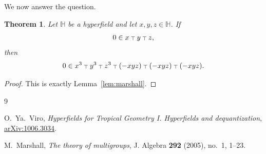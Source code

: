 \documentclass[11pt]{article}
\newtheorem{theorem}{Theorem}
\newcommand{\boxplus}{\mathbin{\lower 0.86108pt\hbox{$\scriptstyle\top$}}}
\newcommand{\hypfield}{\mathbb{H}}
\begin{document}
We now answer the question.

\begin{theorem}\label{thm:main}
Let \(\hypfield\) be a hyperfield and let \(x,y,z\in\hypfield\).  If
\[
0\in x\boxplus y\boxplus z,
\]
then
\[
0\in x^3\boxplus y^3\boxplus z^3
\boxplus (-xyz)\boxplus (-xyz)\boxplus (-xyz).
\]
\end{theorem}

\begin{proof}
This is exactly Lemma~\ref{lem:marshall}.
\end{proof}

\begin{thebibliography}{9}

O.~Ya.~Viro,
\emph{Hyperfields for Tropical Geometry I. Hyperfields and dequantization},
\href{https://ar5iv.labs.arxiv.org/html/1006.3034}{arXiv:1006.3034}.

M.~Marshall,
\emph{The theory of multigroups},
J. Algebra \textbf{292} (2005), no.~1, 1--23.

\end{thebibliography}
\end{document}
